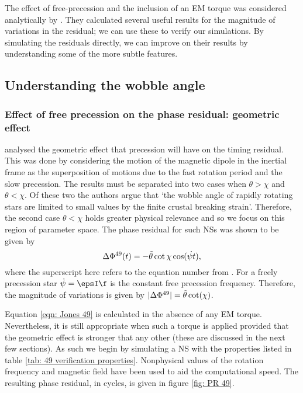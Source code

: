 The effect of free-precession and the inclusion of an EM torque was
considered analytically by \citet{Jones2001}. They calculated several useful
results for the magnitude of variations in the residual; we can use these to
verify our simulations. By simulating the residuals directly, we can improve
on their results by understanding some of the more subtle features.

\subsection{Understanding the wobble angle}


\subsubsection{Effect of free precession on the phase residual: geometric effect}
\citet{Jones2001} analysed the geometric effect that precession will have on
the timing residual. This was done by considering the motion of the magnetic
dipole in the inertial frame as the superposition of motions due to the fast
rotation period and the slow precession. The results
must be separated into two cases when $\theta > \chi$ and $\theta < \chi$. Of
these two the authors argue that `the wobble angle  of rapidly rotating
stars are limited to small values by the finite crustal breaking strain'. Therefore, 
the second case $\theta < \chi$ holds greater physical relevance and so we 
focus on this region of parameter space. The phase residual for such NSs was 
shown to be given by  
\begin{equation}
    \Delta\Phi^{49}(t) = -\tilde{\theta} \cot\chi\cos(\dot{\psi t}),
    \label{eqn: Jones 49}
\end{equation}
where the superscript here refers to the equation number from \citet{Jones2001}.
For a freely precession star $\dot{\psi}=\epsI \f$ is the constant free
precession frequency. Therefore, the magnitude of variations is given by 
$|\Delta\Phi^{49}|=\tilde{\theta} \cot(\chi)$. 

Equation \eqref{eqn: Jones 49} is calculated in the absence of any EM torque.
Nevertheless, it is still appropriate when such a torque is applied provided
that the geometric effect is stronger that any other (these are discussed in
the next few sections). As such we begin by simulating a NS with the properties
listed in table \ref{tab: 49 verification properties}. Nonphysical values of the
rotation frequency and magnetic field have been used to aid the computational
speed. The resulting phase residual, in cycles, is given in figure \ref{fig:
PR 49}.

